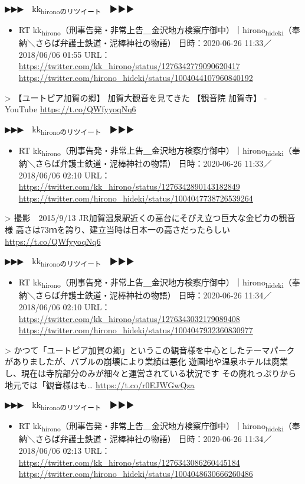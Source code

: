 \documentclass[]{ltjarticle}
\begin{document}
▶▶▶　kk\textsubscript{hironoのリツイート}　▶▶▶  

\begin{itemize}
\item RT kk\textsubscript{hirono}（刑事告発・非常上告＿金沢地方検察庁御中）｜hirono\textsubscript{hideki}（奉納＼さらば弁護士鉄道・泥棒神社の物語） 日時：2020-06-26 11:33／2018/06/06 01:55 URL： \url{https://twitter.com/kk\_hirono/status/1276342779090620417} \url{https://twitter.com/hirono\_hideki/status/1004044107960840192}
\end{itemize}

> 【ユートピア加賀の郷】 加賀大観音を見てきた 【観音院 加賀寺】 - YouTube \url{https://t.co/QWfyyoqNq6}  

▶▶▶　kk\textsubscript{hironoのリツイート}　▶▶▶  

\begin{itemize}
\item RT kk\textsubscript{hirono}（刑事告発・非常上告＿金沢地方検察庁御中）｜hirono\textsubscript{hideki}（奉納＼さらば弁護士鉄道・泥棒神社の物語） 日時：2020-06-26 11:33／2018/06/06 02:10 URL： \url{https://twitter.com/kk\_hirono/status/1276342890143182849} \url{https://twitter.com/hirono\_hideki/status/1004047738726539264}
\end{itemize}

> 撮影　2015/9/13 JR加賀温泉駅近くの高台にそびえ立つ巨大な金ピカの観音様 高さは73ｍを誇り、建立当時は日本一の高さだったらしい \url{https://t.co/QWfyyoqNq6}  

▶▶▶　kk\textsubscript{hironoのリツイート}　▶▶▶  

\begin{itemize}
\item RT kk\textsubscript{hirono}（刑事告発・非常上告＿金沢地方検察庁御中）｜hirono\textsubscript{hideki}（奉納＼さらば弁護士鉄道・泥棒神社の物語） 日時：2020-06-26 11:34／2018/06/06 02:10 URL： \url{https://twitter.com/kk\_hirono/status/1276343032179089408} \url{https://twitter.com/hirono\_hideki/status/1004047932360830977}
\end{itemize}

> かつて「ユートピア加賀の郷」というこの観音様を中心としたテーマパークがありましたが、バブルの崩壊により業績は悪化 遊園地や温泉ホテルは廃業し、現在は寺院部分のみが細々と運営されている状況です その廃れっぷりから地元では「観音様はも… \url{https://t.co/r0EJWGwQza}  

▶▶▶　kk\textsubscript{hironoのリツイート}　▶▶▶  

\begin{itemize}
\item RT kk\textsubscript{hirono}（刑事告発・非常上告＿金沢地方検察庁御中）｜hirono\textsubscript{hideki}（奉納＼さらば弁護士鉄道・泥棒神社の物語） 日時：2020-06-26 11:34／2018/06/06 02:13 URL： \url{https://twitter.com/kk\_hirono/status/1276343086260445184} \url{https://twitter.com/hirono\_hideki/status/1004048630666260486}
\end{itemize}
\end{document}
